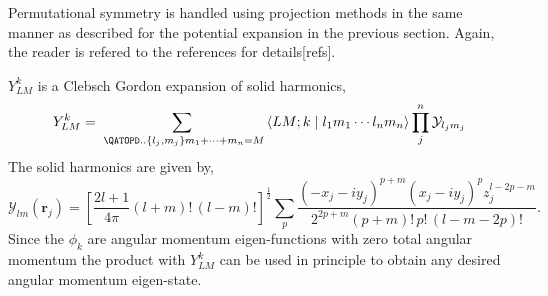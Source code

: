\documentclass[12pt,thmsa]{article}
\begin{document}
Permutational symmetry is handled using projection methods in the same
manner as described for the potential expansion in the previous section.
Again, the reader is refered to the references for details[refs].

$Y_{LM}^k$ is a Clebsch Gordon expansion of solid harmonics\cite
{Biedenharn81}, 
\begin{equation}
Y_{LM}^k=\sum_{\,\,\QATOPD. . {\left\{ l_j,m_j\right\} }{m_1+\cdots
+m_n=M}}\left\langle LM;k\right. |\left. l_1m_1\cdots l_nm_n\right\rangle
\prod_j^n\mathcal{Y}_{l_jm_j}
\end{equation}
The solid harmonics are given by, 
\begin{equation}
\mathcal{Y}_{lm}\left( \mathbf{r}_j\right) =\left[ \frac{2l+1}{4\pi }\left(
l+m\right) !\,\left( l-m\right) !\right] ^{\frac 12}\sum_p\frac{\left(
-x_j-iy_j\right) ^{p+m}\left( x_j-iy_j\right) ^pz_j^{l-2p-m}}{2^{2p+m}\left(
p+m\right) !\,p!\,\left( l-m-2p\right) !}.
\end{equation}
Since the $\phi _k$ are angular momentum eigen-functions with zero total
angular momentum the product with $Y_{LM}^k$ can be used in principle to
obtain any desired angular momentum eigen-state.
\end{document}

